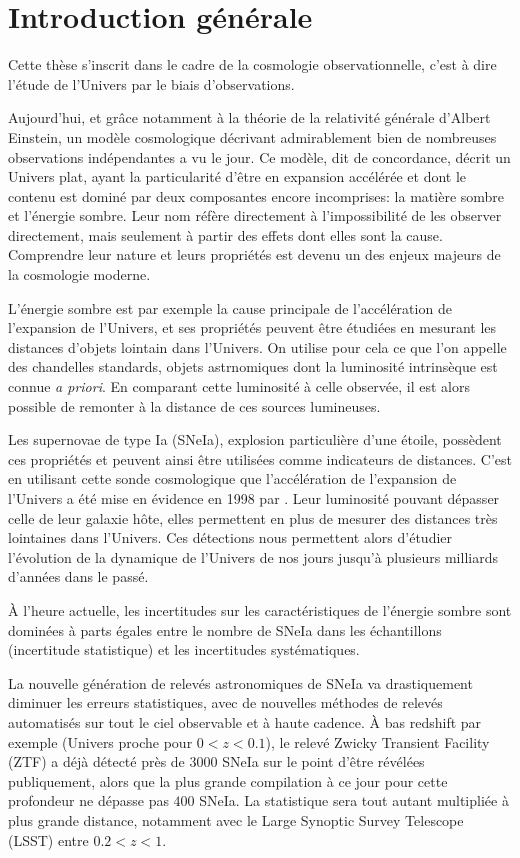 \documentclass[../main/main.tex]{subfiles}
\begin{document}
\chapter*{Introduction générale}\label{cp:intro}

Cette thèse s'inscrit dans le cadre de la cosmologie observationnelle,
c'est à dire l'étude de l'Univers par le biais d'observations.

Aujourd'hui, et grâce notamment à la théorie de la relativité générale
d'Albert Einstein, un modèle cosmologique décrivant admirablement bien
de nombreuses observations indépendantes a vu le jour. Ce modèle, dit de
concordance, décrit un Univers plat, ayant la particularité d'être
en expansion accélérée et dont le contenu est dominé par deux
composantes encore incomprises: la matière sombre et l'énergie sombre.
Leur nom réfère directement à l'impossibilité de les observer
directement, mais seulement à partir des effets dont elles sont la
cause.
Comprendre leur nature et leurs propriétés est devenu un des enjeux majeurs de la cosmologie
moderne.

L'énergie sombre est par exemple la cause principale de l'accélération
de l'expansion de l'Univers, et ses propriétés peuvent être étudiées en mesurant les
distances d'objets lointain dans l'Univers. On utilise pour cela ce que
l'on appelle des chandelles standards, objets astrnomiques dont la
luminosité intrinsèque est connue \textit{a priori}. En comparant cette
luminosité à celle observée, il est alors possible de remonter à la
distance de ces sources lumineuses.

Les supernovae de type Ia (SNeIa), explosion particulière d'une étoile,
possèdent ces propriétés et peuvent ainsi être utilisées comme indicateurs de distances. C'est en utilisant cette sonde
cosmologique que l'accélération de l'expansion de l'Univers a été mise en évidence en 1998 par
\citet{Riess1998,Perlmutter1999}. Leur luminosité
pouvant dépasser celle de leur galaxie hôte, elles permettent en plus de mesurer
des distances très lointaines dans l'Univers. Ces détections nous
permettent alors
d'étudier l'évolution de la dynamique de l'Univers de nos jours jusqu'à
plusieurs milliards d'années dans le passé.

À l'heure actuelle, les incertitudes sur les caractéristiques de
l'énergie sombre sont dominées à parts égales entre le nombre de SNeIa dans les
échantillons (incertitude statistique) et les incertitudes
systématiques.

La nouvelle génération de relevés astronomiques de SNeIa va
drastiquement diminuer les erreurs statistiques, avec de nouvelles
méthodes de relevés automatisés sur tout le ciel observable et à haute
cadence. À bas redshift par exemple (Univers proche pour $0<z<0.1$), le relevé Zwicky
Transient Facility (ZTF) a déjà détecté près de $3000$ SNeIa sur le point
d'être révélées publiquement, alors
que la plus grande compilation à ce jour pour cette profondeur ne
dépasse pas $400$ SNeIa.
La statistique sera tout autant multipliée à plus grande distance,
notamment avec le Large Synoptic Survey Telescope (LSST) entre
$0.2<z<1$.
\end{document}
